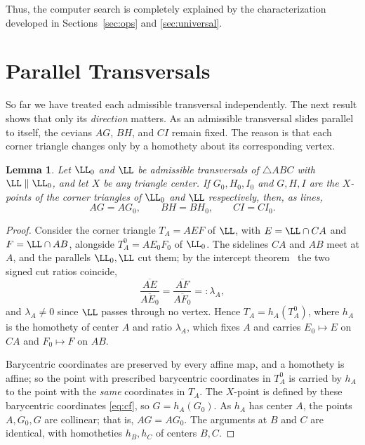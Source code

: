 \documentclass[12pt,a4paper]{amsart}
\newtheorem{lemma}[theorem]{Lemma}
\theoremstyle{remark}
\begin{document}
Thus, the computer search is completely explained by the characterization
developed in Sections~\ref{sec:ops} and \ref{sec:universal}.

\section{Parallel Transversals}
\label{sec:direction}

So far we have treated each admissible transversal independently. The next result
shows that only its \emph{direction} matters. As an admissible transversal slides
parallel to itself, the cevians $AG$, $BH$, and $CI$ remain fixed. The reason is
that each corner triangle changes only by a homothety about its corresponding
vertex.

\begin{lemma}\label{lem:cevfixed}
Let $\LL_0$ and $\LL$ be admissible transversals of $\triangle ABC$ with
$\LL\parallel\LL_0$, and let $X$ be any triangle center. If $G_0,H_0,I_0$ and
$G,H,I$ are the $X$-points of the corner triangles of $\LL_0$ and $\LL$
respectively, then, as lines,
\[
   AG=AG_0,\qquad BH=BH_0,\qquad CI=CI_0 .
\]
\end{lemma}

\begin{proof}
Consider the corner triangle $T_A=AEF$ of $\LL$, with $E=\LL\cap CA$ and
$F=\LL\cap AB$, alongside $T_A^{0}=AE_0F_0$ of $\LL_0$. The sidelines
$CA$ and $AB$ meet at $A$, and the parallels $\LL_0,\LL$ cut them; by the
intercept theorem~\cite{Altshiller-Court} the two signed cut ratios coincide,
\[
   \frac{\overline{AE}}{\overline{AE_0}}
   =\frac{\overline{AF}}{\overline{AF_0}}=:\lambda_A ,
\]
and $\lambda_A\neq0$ since $\LL$ passes through no vertex. Hence
$T_A=h_A(T_A^{0})$, where $h_A$ is the homothety of center $A$
and ratio $\lambda_A$, which fixes $A$ and carries $E_0\mapsto E$ on $CA$ and
$F_0\mapsto F$ on $AB$.

Barycentric coordinates are preserved by every affine map, and a homothety is
affine; so the point with prescribed barycentric coordinates in
$T_A^{0}$ is carried by $h_A$ to the point with the \emph{same}
coordinates in $T_A$.
The $X$-point is defined by these barycentric coordinates
\eqref{eq:cf}, so $G=h_A(G_0)$. As $h_A$ has center $A$, the points $A,G_0,G$ are
collinear; that is, $AG=AG_0$. The arguments at $B$ and $C$ are identical, with
homotheties $h_B,h_C$ of centers $B,C$.
\end{proof}
\end{document}
